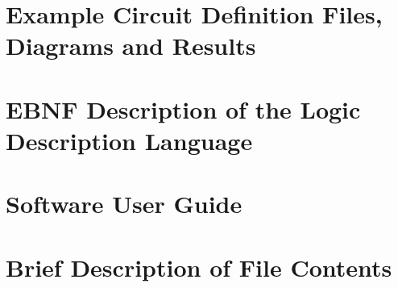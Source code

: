 \documentclass{article}					%
\begin{document}
\newpage
\begin{appendices}
\section{Example Circuit Definition Files, Diagrams and Results}
\section{EBNF Description of the Logic Description Language}
\section{Software User Guide}
\section{Brief Description of File Contents}
\end{appendices}
\printbibliography
\end{document}
